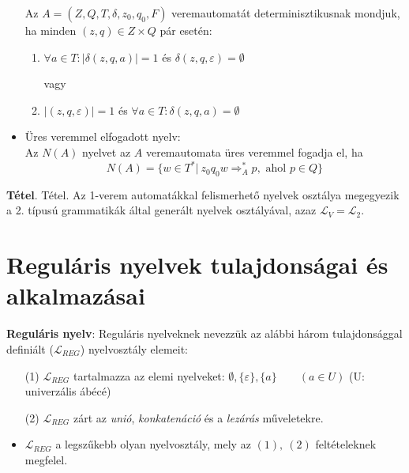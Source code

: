 \documentclass[12pt,margin=0px]{article}
\begin{document}
\begin{itemize}
            Az $A = (Z,Q, T,\delta, z_0, q_0, F)$ veremautomatát determinisztikusnak mondjuk, ha minden $(z, q) \in Z \times Q$ pár esetén:
            \begin{enumerate}								
                \item $\forall a \in T:  |\delta(z, q, a)| = 1$ és $\delta(z, q, \varepsilon) = \emptyset$
			      	      									
                vagy
                \item $|(z, q, \varepsilon)| = 1 $ és $\forall a \in T: \delta(z, q, a) = \emptyset$
            \end{enumerate}
        \item Üres veremmel elfogadott nyelv: \\
                Az $N(A)$ nyelvet az $A$ veremautomata üres veremmel fogadja el, ha
                \[
                    N(A) = \Big\{w \in T^* | \ z_0q_0w \Longrightarrow_A^* p, \textrm{ ahol } p \in Q \Big\}
                \]
		\end{itemize}

    \noindent \textbf{Tétel}. Tétel. Az 1-verem automatákkal felismerhető nyelvek osztálya megegyezik a 2. típusú grammatikák által generált nyelvek osztályával, azaz $\mathcal{L}_{V} = \mathcal{L}_{2}$.

	\section*{Reguláris nyelvek tulajdonságai és alkalmazásai}

    \noindent \textbf{Reguláris nyelv}: Reguláris nyelveknek nevezzük az alábbi három tulajdonsággal definiált ($\mathcal{L}_{REG}$) nyelvosztály elemeit:
    \begin{itemize}
        \item[(1)] $\mathcal{L}_{REG}$ tartalmazza az elemi nyelveket: $\emptyset, \{\varepsilon\},\{a\}\qquad (a \in U)$ (U: univerzális ábécé)
        \item[(2)] $\mathcal{L}_{REG}$ zárt az \emph{unió}, \emph{konkatenáció} és a \emph{lezárás} műveletekre.
        \item $\mathcal{L}_{REG}$ a legszűkebb olyan nyelvosztály, mely az $(1),\ (2)$ feltételeknek megfelel.\\
    \end{itemize}
\end{document}
